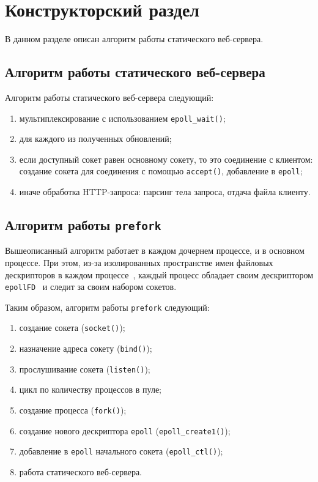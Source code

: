 \chapter{Конструкторский раздел}

В данном разделе описан алгоритм работы статического веб-сервера.

\section{Алгоритм работы статического веб-сервера}

Алгоритм работы статического веб-сервера следующий:

\begin{enumerate}[label=\arabic*)]
	\item мультиплексирование с использованием \texttt{epoll\_wait()};
	\item для каждого из полученных обновлений;
	\item если доступный сокет равен основному сокету, то это соединение с клиентом: создание сокета для соединения с помощью \texttt{accept()}, добавление в \texttt{epoll};
	\item иначе обработка HTTP-запроса: парсинг тела запроса, отдача файла клиенту.
\end{enumerate}

\section{Алгоритм работы \texttt{prefork}}

Вышеописанный алгоритм работает в каждом дочернем процессе, и в основном процессе. При этом, из-за изолированных пространстве имен файловых дескрипторов в каждом процессе~\cite{широков2021методические}, каждый процесс обладает своим дескриптором \texttt{epollFD}~\cite{gammo2004comparing,manual} и следит за своим набором сокетов.

Таким образом, алгоритм работы \texttt{prefork} следующий:

\begin{enumerate}[label=\arabic*)]
	\item создание сокета (\texttt{socket()});
	\item назначение адреса сокету (\texttt{bind()});
	\item прослушивание сокета (\texttt{listen()});
	\item цикл по количеству процессов в пуле;
	\item создание процесса (\texttt{fork()});
	\item создание нового дескриптора \texttt{epoll} (\texttt{epoll\_create1()});
	\item добавление в \texttt{epoll} начального сокета (\texttt{epoll\_ctl()});
	\item работа статического веб-сервера.
\end{enumerate}